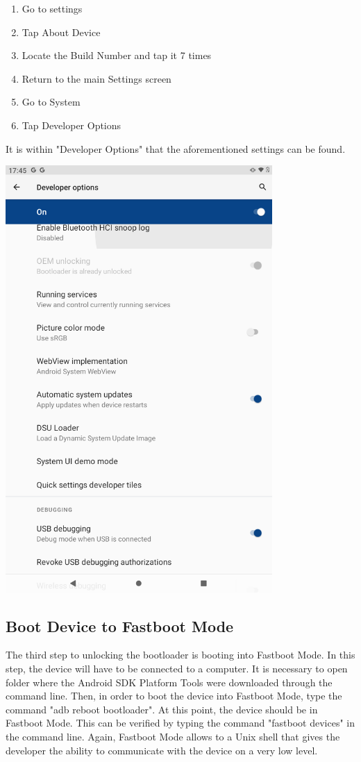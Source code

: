 \begin{enumerate}

\item Go to settings
\item Tap About Device
\item Locate the Build Number and tap it 7 times
\item Return to the main Settings screen
\item Go to System
\item Tap Developer Options

\end{enumerate}

It is within "Developer Options" that the aforementioned settings can be found.

\includegraphics[width=4in]{images/DeveloperOptions}

\subsection{Boot Device to Fastboot Mode}
The third step to unlocking the bootloader is booting into Fastboot Mode. In this step, the device will have to be connected to a computer. It is necessary to 
open folder where the Android SDK Platform Tools were downloaded through the command line. Then, in order to boot the device into Fastboot Mode, type the command
"adb reboot bootloader". At this point, the device should be in Fastboot Mode. This can be verified by typing the command "fastboot devices" in the command line.
Again, Fastboot Mode allows to a Unix shell that gives the developer the ability to communicate with the device on a very low level.

